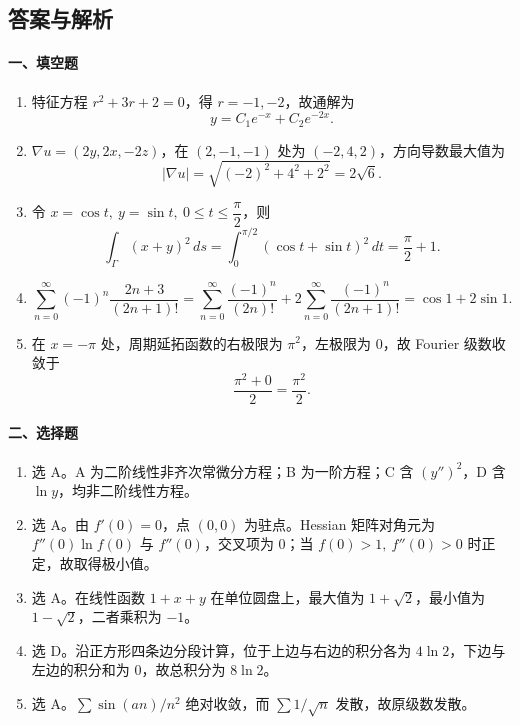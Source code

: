 \subsection{答案与解析}

\paragraph*{一、填空题}
\begin{enumerate}
  \item 特征方程 $r^2+3r+2=0$，得 $r=-1,-2$，故通解为
  \[
    y=C_1e^{-x}+C_2e^{-2x}.
  \]
  \item $\nabla u=(2y,2x,-2z)$，在 $(2,-1,-1)$ 处为 $(-2,4,2)$，方向导数最大值为
  \[
    |\nabla u|=\sqrt{(-2)^2+4^2+2^2}=2\sqrt6.
  \]
  \item 令 $x=\cos t,\ y=\sin t,\ 0\le t\le \dfrac{\pi}{2}$，则
  \[
    \int_\Gamma (x+y)^2\,ds
    =\int_0^{\pi/2}(\cos t+\sin t)^2\,dt
    =\frac{\pi}{2}+1.
  \]
  \item
  \[
    \sum_{n=0}^{\infty}(-1)^n\frac{2n+3}{(2n+1)!}
    =
    \sum_{n=0}^{\infty}\frac{(-1)^n}{(2n)!}
    +2\sum_{n=0}^{\infty}\frac{(-1)^n}{(2n+1)!}
    =\cos 1+2\sin 1.
  \]
  \item 在 $x=-\pi$ 处，周期延拓函数的右极限为 $\pi^2$，左极限为 $0$，故 Fourier 级数收敛于
  \[
    \frac{\pi^2+0}{2}=\frac{\pi^2}{2}.
  \]
\end{enumerate}

\paragraph*{二、选择题}
\begin{enumerate}
  \item 选 A。A 为二阶线性非齐次常微分方程；B 为一阶方程；C 含 $(y'')^2$，D 含 $\ln y$，均非二阶线性方程。
  \item 选 A。由 $f'(0)=0$，点 $(0,0)$ 为驻点。Hessian 矩阵对角元为 $f''(0)\ln f(0)$ 与 $f''(0)$，交叉项为 $0$；当 $f(0)>1,\ f''(0)>0$ 时正定，故取得极小值。
  \item 选 A。在线性函数 $1+x+y$ 在单位圆盘上，最大值为 $1+\sqrt2$，最小值为 $1-\sqrt2$，二者乘积为 $-1$。
  \item 选 D。沿正方形四条边分段计算，位于上边与右边的积分各为 $4\ln2$，下边与左边的积分和为 $0$，故总积分为 $8\ln2$。
  \item 选 A。$\sum \sin(an)/n^2$ 绝对收敛，而 $\sum 1/\sqrt n$ 发散，故原级数发散。
\end{enumerate}

